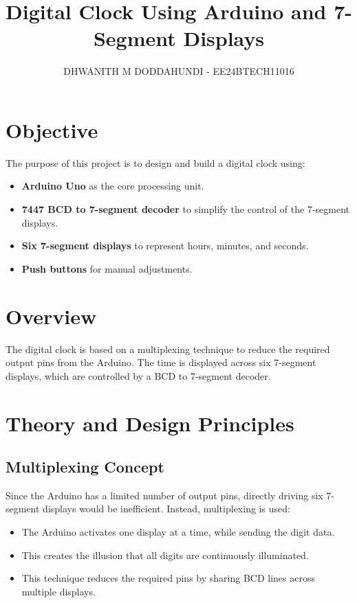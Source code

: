 \documentclass[a4paper,12pt]{article}
\title{\textbf{Digital Clock Using Arduino and 7-Segment Displays}}
\author{DHWANITH M DODDAHUNDI - EE24BTECH11016}
\date{}
\begin{document}
\maketitle

\section*{Objective}
The purpose of this project is to design and build a digital clock using:
\begin{itemize}
    \item \textbf{Arduino Uno} as the core processing unit.
    \item \textbf{7447 BCD to 7-segment decoder} to simplify the control of the 7-segment displays.
    \item \textbf{Six 7-segment displays} to represent hours, minutes, and seconds.
    \item \textbf{Push buttons} for manual adjustments.
\end{itemize}

\section{Overview}
The digital clock is based on a multiplexing technique to reduce the required output pins from the Arduino. The time is displayed across six 7-segment displays, which are controlled by a BCD to 7-segment decoder.

\section{Theory and Design Principles}

\subsection{Multiplexing Concept}
Since the Arduino has a limited number of output pins, directly driving six 7-segment displays would be inefficient. Instead, multiplexing is used:
\begin{itemize}
    \item The Arduino activates one display at a time, while sending the digit data.
    \item This creates the illusion that all digits are continuously illuminated.
    \item This technique reduces the required pins by sharing BCD lines across multiple displays.
\end{itemize}
\end{document}
